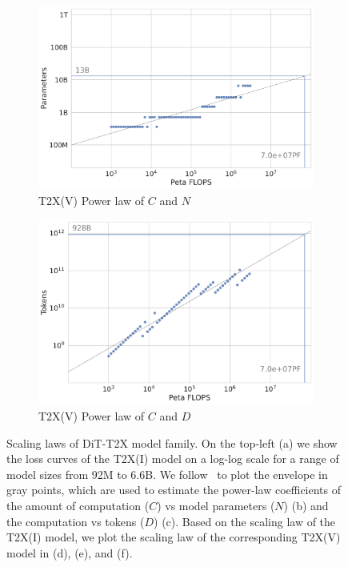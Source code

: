 \begin{figure}[t]
\begin{subfigure}{0.325\textwidth}
        \includegraphics[width=\textwidth]{figures/video_computation_vs_parameter.pdf}
        \caption{T2X(V) Power law of $C$ and $N$}
        \label{fig:video-computation-vs-parameter}
    \end{subfigure}
    \hfill
    \begin{subfigure}{0.325\textwidth}
        \centering
        \includegraphics[width=\textwidth]{figures/video_computation_vs_token.pdf}
        \caption{T2X(V) Power law of $C$ and $D$}
        \label{fig:video-computation-vs-token}
    \end{subfigure}
    \caption{Scaling laws of DiT-T2X model family. On the top-left (a) we show the loss curves of the T2X(I) model on a log-log scale for a range of model sizes from 92M to 6.6B. We follow~\cite{hoffmann2022training} to plot the envelope in gray points, which are used to estimate the power-law coefficients of the amount of computation ($C$) vs model parameters ($N$) (b) and the computation vs tokens ($D$) (c). Based on the scaling law of the T2X(I) model, we plot the scaling law of the corresponding T2X(V) model in (d), (e), and (f).}
    \label{fig:image_scaling_laws}
\end{figure}

